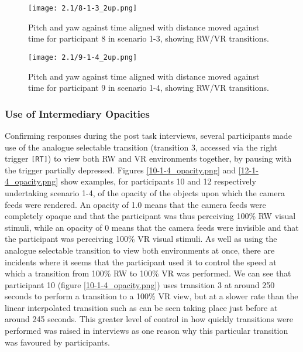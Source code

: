 \begin{figure}
	\begin{center}
	\texttt{[image: 2.1/8-1-3\_2up.png]}
	\caption{Pitch and yaw against time aligned with distance moved against time for participant 8 in scenario 1-3, showing RW/VR transitions.}
	\label{8-1-3_2up.png}
	\end{center}
\end{figure}

\begin{figure}
	\begin{center}
	\texttt{[image: 2.1/9-1-4\_2up.png]}
	\caption{Pitch and yaw against time aligned with distance moved against time for participant 9 in scenario 1-4, showing RW/VR transitions.}
	\label{9-1-4_2up.png}
	\end{center}
\end{figure}


\newpage

\subsubsection{Use of Intermediary Opacities}

Confirming responses during the post task interviews, several participants made use of the analogue selectable transition (transition 3, accessed via the right trigger \texttt{[RT]}) to view both RW and VR environments together, by pausing with the trigger partially depressed. Figures \ref{10-1-4_opacity.png} and \ref{12-1-4_opacity.png} show examples, for participants 10 and 12 respectively undertaking scenario 1-4, of the opacity of the objects upon which the camera feeds were rendered. An opacity of 1.0 means that the camera feeds were completely opaque and that the participant was thus perceiving 100\% RW visual stimuli, while an opacity of 0 means that the camera feeds were invisible and that the participant was perceiving 100\% VR visual stimuli. As well as using the analogue selectable transition to view both environments at once, there are incidents where it seems that the participant used it to control the speed at which a transition from 100\% RW to 100\% VR was performed. We can see that participant 10 (figure \ref{10-1-4_opacity.png}) uses transition 3 at around 250 seconds to perform a transition to a 100\% VR view, but at a slower rate than the linear interpolated transition such as can be seen taking place just before at around 245 seconds. This greater level of control in how quickly transitions were performed was raised in interviews as one reason why this particular transition was favoured by participants.


